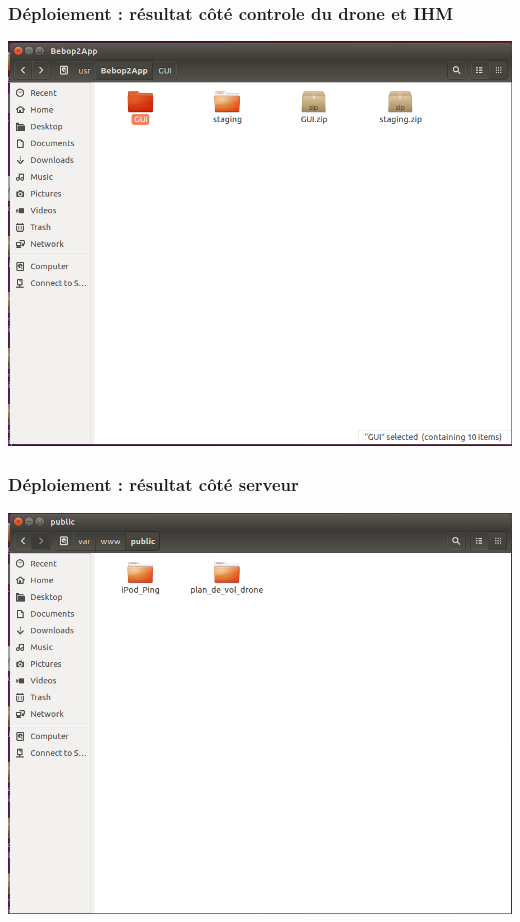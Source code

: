 \documentclass{beamer}
\begin{document}
	
	\begin{frame}
		\begin{center}
		\frametitle{Déploiement : résultat côté controle du drone et IHM}
        \includegraphics[scale=0.3]{result_deploiment_3.png}
		\end{center}
	\end{frame}

	
	\begin{frame}
		\begin{center}
		\frametitle{Déploiement : résultat côté serveur}
        \includegraphics[scale=0.3]{result_deploiment_4.png}
		\end{center}
	\end{frame}
\end{document}
